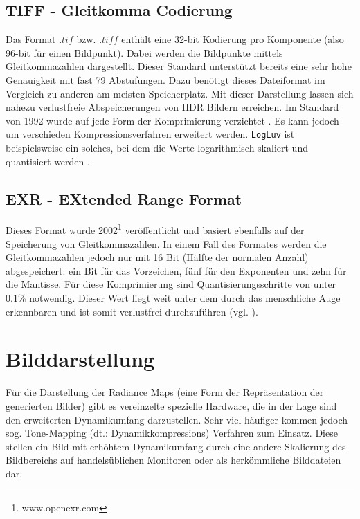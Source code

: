 \subsection{TIFF - Gleitkomma Codierung}
\label{sub:tiff}
Das Format $.tif$ bzw. $.tiff$ enthält eine 32-bit Kodierung pro Komponente (also 96-bit für einen Bildpunkt). Dabei werden die Bildpunkte mittels Gleitkommazahlen dargestellt\cite{adobe:tiff}. Dieser Standard unterstützt bereits eine sehr hohe Genauigkeit mit fast 79 Abstufungen. Dazu benötigt dieses Dateiformat im Vergleich zu anderen am meisten Speicherplatz. Mit dieser Darstellung lassen sich nahezu verlustfreie Abspeicherungen von \gls{HDR} Bildern erreichen. Im Standard von 1992 wurde auf jede Form der Komprimierung verzichtet \cite[S. 93]{Reinhard}. Es kann jedoch um verschieden Kompressionsverfahren erweitert werden. \texttt{LogLuv} ist beispielsweise ein solches, bei dem die Werte logarithmisch skaliert und quantisiert werden \cite{logluv}. 


\subsection{EXR - EXtended Range Format}

Dieses Format wurde 2002\footnote{www.openexr.com} veröffentlicht und basiert ebenfalls auf der Speicherung von Gleitkommazahlen. In einem Fall des Formates werden die Gleitkommazahlen jedoch nur mit 16 Bit (Hälfte der normalen Anzahl) abgespeichert: ein Bit für das Vorzeichen, fünf für den Exponenten und zehn für die Mantisse. Für diese Komprimierung sind Quantisierungsschritte von unter 0.1\% notwendig. Dieser Wert liegt weit unter dem durch das menschliche Auge erkennbaren und ist somit verlustfrei durchzuführen (vgl. \cite[S. 97f]{Reinhard}).

\section{Bilddarstellung}
\label{subsec:ToneMapping}
 Für die Darstellung der \glspl{Radiance Map} (eine Form der Repräsentation der generierten Bilder) gibt es vereinzelte spezielle Hardware, die in der Lage sind den erweiterten Dynamikumfang darzustellen. Sehr viel häufiger kommen jedoch sog. \gls{Tone-Mapping} (dt.: Dynamikkompressions) Verfahren zum Einsatz. Diese stellen ein Bild mit erhöhtem \gls{Dynamikumfang} durch eine andere Skalierung des Bildbereichs auf handelsüblichen Monitoren oder als herkömmliche Bilddateien dar. 
 
